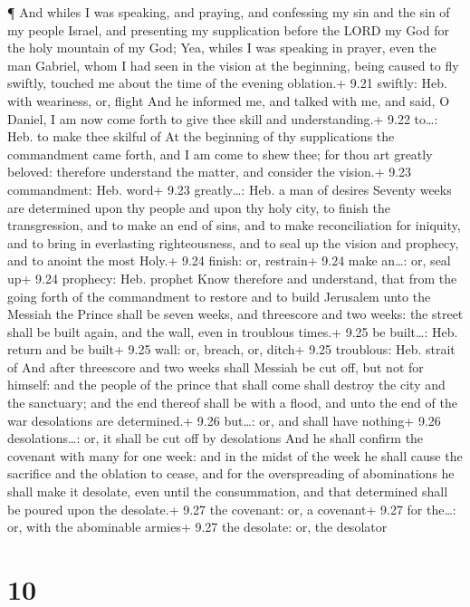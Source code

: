  ¶ And whiles I was speaking, and praying, and confessing
my sin and the sin of my people Israel, and presenting my supplication
before the LORD my God for the holy mountain of my God; 
Yea, whiles I was speaking in prayer, even the man Gabriel, whom I had
seen in the vision at the beginning, being caused to fly swiftly,
touched me about the time of the evening oblation.+ 9.21 swiftly: Heb.
with weariness, or, flight  And he informed me, and talked
with me, and said, O Daniel, I am now come forth to give thee skill and
understanding.+ 9.22 to\ldots: Heb. to make thee skilful of
 At the beginning of thy supplications the commandment came
forth, and I am come to shew thee; for thou art greatly beloved:
therefore understand the matter, and consider the vision.+ 9.23
commandment: Heb. word+ 9.23 greatly\ldots: Heb. a man of desires
 Seventy weeks are determined upon thy people and upon thy
holy city, to finish the transgression, and to make an end of sins, and
to make reconciliation for iniquity, and to bring in everlasting
righteousness, and to seal up the vision and prophecy, and to anoint the
most Holy.+ 9.24 finish: or, restrain+ 9.24 make an\ldots: or, seal up+
9.24 prophecy: Heb. prophet  Know therefore and understand,
that from the going forth of the commandment to restore and to build
Jerusalem unto the Messiah the Prince shall be seven weeks, and
threescore and two weeks: the street shall be built again, and the wall,
even in troublous times.+ 9.25 be built\ldots: Heb. return and be built+
9.25 wall: or, breach, or, ditch+ 9.25 troublous: Heb. strait of
 And after threescore and two weeks shall Messiah be cut
off, but not for himself: and the people of the prince that shall come
shall destroy the city and the sanctuary; and the end thereof shall be
with a flood, and unto the end of the war desolations are determined.+
9.26 but\ldots: or, and shall have nothing+ 9.26 desolations\ldots: or,
it shall be cut off by desolations  And he shall confirm
the covenant with many for one week: and in the midst of the week he
shall cause the sacrifice and the oblation to cease, and for the
overspreading of abominations he shall make it desolate, even until the
consummation, and that determined shall be poured upon the desolate.+
9.27 the covenant: or, a covenant+ 9.27 for the\ldots: or, with the
abominable armies+ 9.27 the desolate: or, the desolator

\hypertarget{section-9}{%
\section{10}\label{section-9}}

